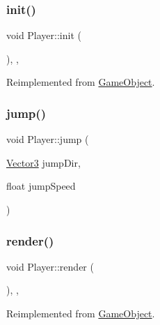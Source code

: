 \subsubsection{\texorpdfstring{init()}{init()}}
{\footnotesize\ttfamily void Player\+::init (\begin{DoxyParamCaption}{ }\end{DoxyParamCaption})\hspace{0.3cm}{\ttfamily [inline]}, {\ttfamily [final]}, {\ttfamily [virtual]}}



Reimplemented from \hyperlink{class_game_object_aecb2c1b9f69715d854f7604d5d7978ec}{Game\+Object}.

\mbox{\label{class_player_a72cc16348453f3a4b871eb2486c91497}} 
\subsubsection{\texorpdfstring{jump()}{jump()}}
{\footnotesize\ttfamily void Player\+::jump (\begin{DoxyParamCaption}\item[{\hyperlink{class_vector3}{Vector3}}]{jump\+Dir,  }\item[{float}]{jump\+Speed }\end{DoxyParamCaption})\hspace{0.3cm}{\ttfamily [inline]}}

\mbox{\label{class_player_a4da76233f59ad0254aa6ec533f9badcc}} 
\subsubsection{\texorpdfstring{render()}{render()}}
{\footnotesize\ttfamily void Player\+::render (\begin{DoxyParamCaption}{ }\end{DoxyParamCaption})\hspace{0.3cm}{\ttfamily [inline]}, {\ttfamily [final]}, {\ttfamily [virtual]}}



Reimplemented from \hyperlink{class_game_object_a484efb66a7a27c101e84c11d9905d7a6}{Game\+Object}.

\mbox{\label{class_player_a038a74bd768b6eec8fbe57cb2bacf811}} 
